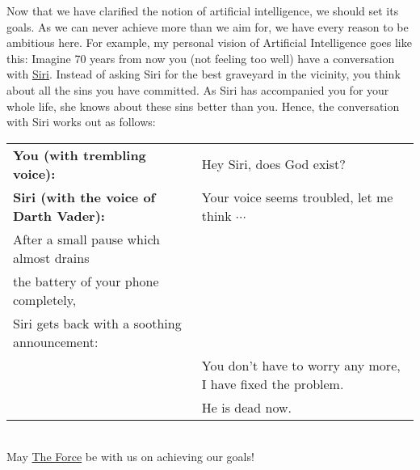 Now that we have clarified the notion of artificial intelligence, we should set its goals.  As we
can never achieve more than we aim for, we have every reason to be ambitious here.  For example, my
personal vision of Artificial Intelligence goes like this: 
Imagine 70 years from now you (not feeling too well) have a conversation with
\href{https://en.wikipedia.org/wiki/Siri}{Siri}.  Instead of asking Siri for the
best graveyard in the vicinity, you think about all the sins you have committed.  As Siri has
accompanied you for your whole life, she knows about these sins better than you.  Hence,  
the conversation with Siri works out as follows: 
\\[0.2cm]
\begin{tabular}[t]{ll}
\textbf{You (with trembling voice):} & Hey Siri, does God exist?   \\[0.2cm]
\textbf{Siri (with the voice of Darth Vader):} & Your voice seems troubled, let me think $\cdots$ \\
After a small pause which almost drains \\
the battery of your phone completely, \\
Siri gets back with a soothing announcement: \\           
                                     & You don't have to worry any more, I have fixed the problem.  \\
                                     & He is dead now.  
\end{tabular}
\\[0.2cm]
May \href{https://en.wikipedia.org/wiki/The_Force_(Star_Wars)}{The Force} be with us on achieving our goals!

